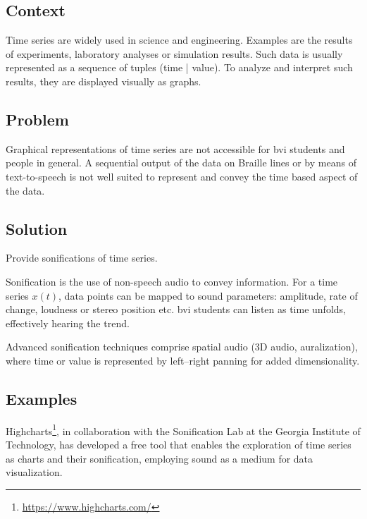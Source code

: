 \patternFour

\subsection*{Context}

    Time series are widely used in science and engineering. Examples are the results of experiments, laboratory analyses or simulation results.
Such data is usually represented as a sequence of tuples (time | value). 
To analyze and interpret such results, they are displayed visually as graphs.
    
\subsection*{Problem}

\begin{itshape}

Graphical representations of time series  are not accessible for \ac{bvi} students and people in general. A sequential output of the data on Braille lines or by means of text-to-speech is not well suited to represent and convey the time based aspect of the data.   

\end{itshape}

\subsection*{Solution}


\begin{sol}

Provide sonifications of time series.
\end{sol}

Sonification is the use of non-speech audio to convey information.
For a time series  $x(t)$, data points can be mapped to sound parameters:
amplitude, rate of change, loudness or stereo position etc. 
\ac{bvi} students can listen as time unfolds, effectively hearing the trend.

Advanced sonification techniques comprise spatial audio (3D audio, auralization), where time or value is represented by left–right panning for added dimensionality.



\subsection*{Examples}

Highcharts\footnote{\url{https://www.highcharts.com/}}, in collaboration with the Sonification Lab at the Georgia Institute of Technology, has developed a free tool that enables the exploration of time series as charts and their sonification, employing sound as a medium for data visualization.

